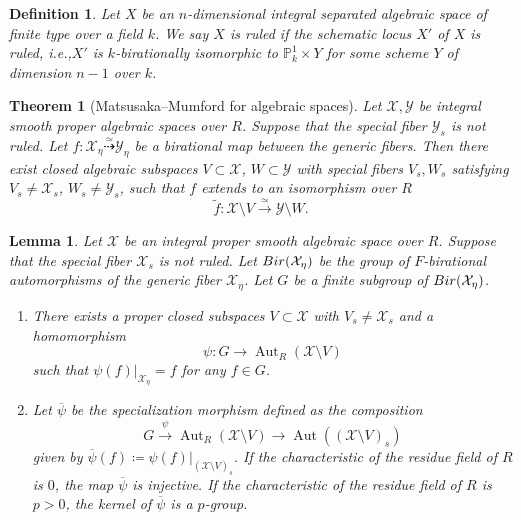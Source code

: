 \documentclass[10pt,a4paper]{amsart}
\newtheorem{lemma}{Lemma}
\newtheorem{definition}{Definition}
\newtheorem{theorem}{Theorem}
\DeclareMathOperator{\Aut}{Aut}
\newcommand{\Bir}{{\rm Bir}}
\newcommand{\PP}{\mathbb{P}}
\begin{document}
\begin{definition}
\label{def:Ruled}
Let $X$ be an $n$-dimensional integral separated algebraic space of finite type over a field $k$.
We say $X$ is ruled if the schematic locus $X'$ of $X$ is ruled, i.e.,$X'$ is $k$-birationally isomorphic to $\PP^{1}_{k} \times Y$ for some scheme $Y$ of dimension $n-1$ over $k$. 
\end{definition}

\begin{theorem}[Matsusaka--Mumford for algebraic spaces]
\label{ClosedSubset}
Let $\mathcal{X}, \mathcal{Y}$ be integral smooth proper algebraic spaces over $R$.
Suppose that the special fiber $\mathcal{Y}_{s}$ is not ruled.
Let $f \colon \mathcal{X}_{\eta} \overset{\simeq}{\dashrightarrow} \mathcal{Y}_{\eta}$
be a birational map between the generic fibers.
Then there exist closed algebraic subspaces
$V \subset \mathcal{X}$, $W \subset \mathcal{Y}$
with special fibers $V_{s}, W_{s}$ satisfying $V_{s} \neq \mathcal{X}_{s}$, $W_{s} \neq \mathcal{Y}_{s}$,
such that
$f$ extends to an isomorphism over $R$
\[
  \widetilde{f} \colon 
  \mathcal{X} \setminus V \overset{\simeq}{\to}
  \mathcal{Y} \setminus W.
\]
\end{theorem}

\begin{lemma}
\label{Lemma:Specialization}
Let $\mathcal{X}$
be an integral proper smooth algebraic space over $R$.
Suppose that the special fiber $\mathcal{X}_{s}$ is not ruled.
Let $\Bir(\mathcal{X}_{\eta})$ be the group of $F$-birational automorphisms
of the generic fiber $\mathcal{X}_{\eta}$.
Let $G$ be a finite subgroup of $\Bir(\mathcal{X}_{\eta})$.
\begin{enumerate}
\item There exists a proper closed subspaces $V \subset \mathcal{X}$
with $V_s \neq \mathcal{X}_{s}$ and a homomorphism
\[
\psi \colon G \to \Aut_R(\mathcal{X} \setminus V)
\]
such that $\psi(f)|_{\mathcal{X}_{\eta}} = f$ for any $f\in G$.

\item Let $\overline{\psi}$ be the specialization morphism defined as the composition 
\[
G \overset{\psi}{\to} \Aut_R(\mathcal{X} \setminus V)
 \to \Aut((\mathcal{X} \setminus V)_{s})
\]
given by $\overline{\psi}(f) \coloneqq \psi(f)|_{(\mathcal{X} \setminus V)_{s}}$.
If the characteristic of the residue field of $R$ is $0$,
the map $\overline{\psi}$ is injective.
If the characteristic of the residue field of $R$ is $p > 0$,
the kernel of $\overline{\psi}$ is a $p$-group.
\end{enumerate}
\end{lemma}
\end{document}
